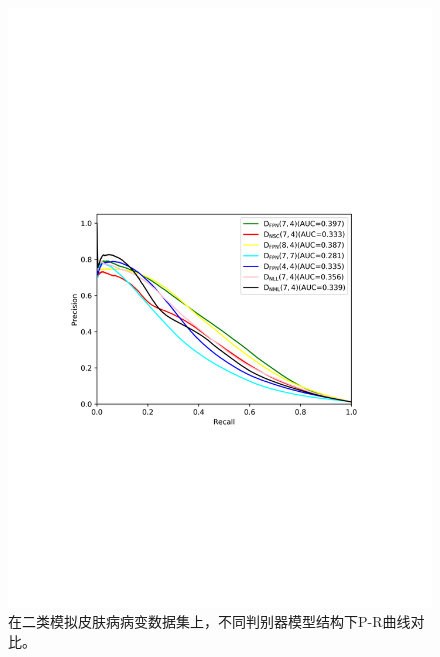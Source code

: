\begin{figure}[h]
	\centering
	\includegraphics[width=1.0\textwidth]{figure/pr_curve_dis_arch/pr_curve.pdf}
	\caption[不同判别器模型结构下P-R曲线对比]{在二类模拟皮肤病病变数据集上，不同判别器模型结构下P-R曲线对比。} 
	\label{fig:pr_curve_skin_dis_arch}
\end{figure}

